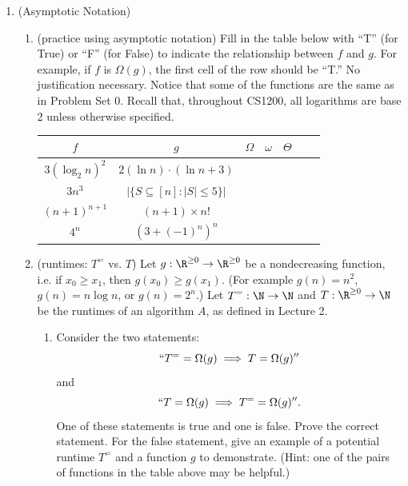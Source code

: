 \documentclass[11pt]{article}
\begin{document}
\begin{enumerate}
    \item (Asymptotic Notation) 
    \begin{enumerate}
    \item (practice using asymptotic notation)
        Fill in the table below with ``T'' (for True) or ``F'' (for False) to indicate the relationship between $f$ and $g$. For example, if $f$ is $\Omega(g)$, the first cell of the row should be ``T.''   No justification necessary.  Notice that some of the functions are the same as in Problem Set 0. Recall that, throughout CS1200, all logarithms are base 2 unless otherwise specified. 
    
        \begin{table}[h!] 
        \centering
        \bgroup
        \def\arraystretch{1.3}
        \begin{tabular}{||c | c || c | c | c | c | c ||}
         \hline
         $f$ & $g$ & $\Omega$ & $\omega$ & $\Theta$ \\
         \hline\hline
         $3(\log_2 n)^{2}$ & $2(\ln n) \cdot (\ln n + 3)$ & & & \\ \hline
         $3n^3$ & $|\{ S \subseteq [n] : |S| \leq 5 \}|$ & & &  \\ \hline
         $(n+1)^{n+1}$ & $(n+1) \times n!$ & & & \\ \hline
         $4^n$ & $\left(3+(-1)^n\right)^n$ & & & \\ \hline
        \end{tabular}
        \egroup
        \end{table}

    \item  (runtimes: $T^=$ vs. $T$)  
    Let $g : \R^{\geq 0}\rightarrow \R^{\geq 0}$ be a nondecreasing function, i.e. if $x_0\geq x_1$, then $g(x_0)\geq g(x_1)$. (For example $g(n)=n^2$, $g(n)=n\log n$, or $g(n)=2^n$.) Let $T^{=} : \N\rightarrow \N$ and $T : \R^{\geq 0}\rightarrow \N$ be the runtimes of an algorithm $A$, as defined in Lecture 2. 
    \begin{enumerate} 
    \item Consider the two statements: 
    $$``T^{=} = \Omega(g) \implies T = \Omega(g)''$$
    and 
    $$``T = \Omega(g) \implies T^{=} = \Omega(g)''.$$
    One of these statements is true and one is false. Prove the correct statement. For the false statement, give an example of a potential runtime $T^{=}$ and a function $g$ to demonstrate.  (Hint: one of the pairs of functions in the table above may be helpful.)
    

\end{enumerate}
\end{enumerate}
\end{enumerate}
\end{document}
